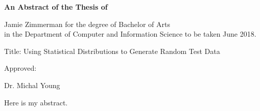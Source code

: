 
\begin{center}

\normalsize \textbf {An Abstract of the Thesis of}

Jamie Zimmerman for the degree of Bachelor of Arts \\
in the Department of Computer and Information Science to be taken June 2018.

\vspace{2cm}


Title: Using Statistical Distributions to Generate Random Test Data

\vspace{1.5cm}

Approved: \hrulefill

Dr. Michal Young

\end{center}
Here is my abstract.
